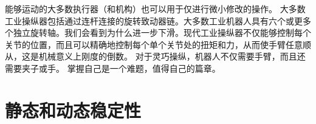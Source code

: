 能够运动的大多数执行器（和机构）也可以用于仅进行微小修改的操作。 大多数工业操纵器包括通过连杆连接的旋转致动器链。大多数工业机器人具有六个或更多个独立旋转轴。我们会看到为什么进一步下滑。现代工业操纵器不仅能够控制每个关节的位置，而且可以精确地控制每个单个关节处的扭矩和力，从而使手臂任意顺从，这是机械意义上刚度的倒数。 对于灵巧操纵，机器人不仅需要手臂，而且还需要夹子或手。 掌握自己是一个难题，值得自己的篇章。


\section{静态和动态稳定性}\label{sec:stability}


